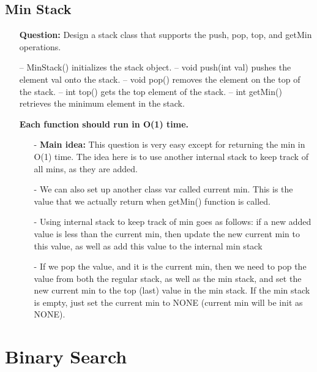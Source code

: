 \documentclass[12pt]{article}
\begin{document}
\subsection{Min Stack}
\begin{enumerate}
  \item[] \textbf{Question:} Design a stack class that supports the push, pop, top, and getMin operations.

-- MinStack() initializes the stack object.
-- void push(int val) pushes the element val onto the stack.
-- void pop() removes the element on the top of the stack.
-- int top() gets the top element of the stack.
-- int getMin() retrieves the minimum element in the stack.

\textbf{Each function should run in O(1) time.}
    
    \begin{enumerate}
      \item[-] \textbf{Main idea:} This question is very easy except for returning the min in O(1) time. The idea here is to use another internal stack to keep track of all mins, as they are added.
      \item[-] We can also set up another class var called current min. This is the value that we actually return when getMin() function is called. 
      \item[-] Using internal stack to keep track of min goes as follows: if a new added value is less than the current min, then update the new current min to this value, as well as add this value to the internal min stack 
      \item[-] If we pop the value, and it is the current min, then we need to pop the value from both the regular stack, as well as the min stack, and set the new current min to the top (last) value in the min stack. If the min stack is empty, just set the current min to NONE (current min will be init as NONE).
    \end{enumerate}
\end{enumerate}


\section{Binary Search}
\end{document}
